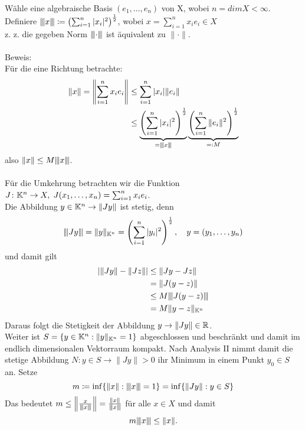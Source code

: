 \begin{beweis}
	Wähle eine algebraische Basis $(e_{1}, \dotsc, e_{n})$ von X, wobei $ n = dim X < \infty$. \\
	Definiere $ \vertiii{x} \coloneqq \left(\sum_{i = 1}^{n} |x_{i}|^2\right)^{\frac{1}{2}}$, wobei $x = \sum_{i = 1}^{n} x_{i} e_{i} \in X$ \\
	
	z. z. die gegeben Norm $\vertiii{ \cdot }$ ist äquivalent zu $\| \cdot \|$. \\ \\
	Beweis: \\
	Für die eine Richtung betrachte: 
	\begin{align*}
		\| x \| = \left\| \sum_{i = 1}^{n} x_{i} e_{i} \right\| & \leq \sum_{i = 1}^{n} |x_{i}| \|  e_{i} \| \\ 
													& \leq \underbrace{ \left( \sum_{i = 1}^{n} |x_{i}|^{2} \right)^\frac{1}{2} }_{= \vertiii{ x }} \underbrace{ \left( \sum_{i = 1}^{n} \| e_{i} \|^{2} \right)^\frac{1}{2} }_{=: M}
	\end{align*}
	also $\| x \| \leq M \vertiii{ x }$. \\ \\
	Für die Umkehrung betrachten wir die Funktion $J \colon \MdK^{n} \rightarrow X, \hspace{0.1cm} J(x_{1}, \dotsc, x_{n}) = \sum_{i = 1}^{n} x_{i} e_{i}$. \\
	Die Abbildung $y \in \MdK^{n} \rightarrow \| Jy \| $ ist stetig, denn
	 \[ \vertiii{ Jy } = \| y \|_{\MdK^{n}} = \left( \sum_{i = 1}^{n} |y_{i}|^{2} \right)^{\frac{1}{2}}, \quad y = (y_{1}, \dotsc, y_{n}) \]
	und damit gilt 
	\begin{align*}
 	 	 \left| \| Jy \| - \| Jz \| \right| & \leq \| Jy - Jz \| \\
 	 	 & = \| J(y - z) \| \\
 	 	 & \leq M \vertiii{ J (y - z) } \\
 	 	 & = M \| y - z \|_{\MdK^{n}}
 	 \end{align*}
 	Daraus folgt die Stetigkeit der Abbildung $ y \rightarrow \| Jy \| \in \MdR$. \\
	Weiter ist $S = \{y \in \MdK^{n}: \| y \|_{\MdK^n} = 1 \}$ abgeschlossen und beschränkt und damit im endlich dimensionalen Vektorraum kompakt. Nach Analysis II nimmt damit die stetige Abbildung $N \colon y \in S \rightarrow \| Jy \| > 0$ ihr Minimum in einem Punkt $y_{0} \in S$ an. Setze
		\[ m \coloneqq \inf\{\| x \| : \vertiii{ x } = 1\} = \inf \{ \| Jy \|: y \in S \} \]
	Das bedeutet $m \leq \left\| \frac{x}{ \vertiii{ x } } \right\| =  \frac{ \| x \| }{ \vertiii{ x } }$ für alle $x \in X$ und damit
		\[ m \vertiii{ x } \leq \| x \|. \]
\end{beweis}


